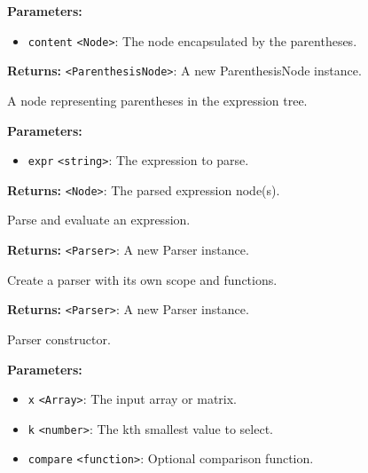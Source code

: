 \documentclass[12pt,a4paper]{article}
\begin{document}
\noindent \textbf{Parameters:}
\begin{itemize}
  \item \texttt{content} \texttt{<Node>}: The node encapsulated by the parentheses.
\end{itemize}

\noindent \textbf{Returns:} \texttt{<ParenthesisNode>}: A new ParenthesisNode instance.

\noindent A node representing parentheses in the expression tree.

\vspace{5mm}
\noindent {}


\noindent \textbf{Parameters:}
\begin{itemize}
  \item \texttt{expr} \texttt{<string>}: The expression to parse.
\end{itemize}

\noindent \textbf{Returns:} \texttt{<Node>}: The parsed expression node(s).

\noindent Parse and evaluate an expression.

\vspace{5mm}
\noindent {}


\noindent \textbf{Returns:} \texttt{<Parser>}: A new Parser instance.

\noindent Create a parser with its own scope and functions.

\vspace{5mm}
\noindent {}


\noindent \textbf{Returns:} \texttt{<Parser>}: A new Parser instance.

\noindent Parser constructor.

\vspace{5mm}
\noindent {}


\noindent \textbf{Parameters:}
\begin{itemize}
  \item \texttt{x} \texttt{<Array>}: The input array or matrix.
  \item \texttt{k} \texttt{<number>}: The kth smallest value to select.
  \item \texttt{compare} \texttt{<function>}: Optional comparison function.
\end{itemize}
\end{document}
